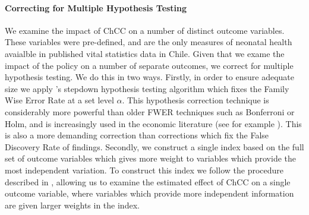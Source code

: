 \documentclass[12pt]{article}
\begin{document}
\begin{spacing}{1.4}

\paragraph{Correcting for Multiple Hypothesis Testing}
We examine the impact of ChCC on a number of distinct outcome
variables.  These variables were pre-defined, and are the only
measures of neonatal health avaialble in published vital statistics
data in Chile.  Given that we exame the impact of the policy on a
number of separate outcomes, we correct for multiple hypothesis
testing.  We do this in two ways.  Firstly, in order to ensure
adequate size we apply \citet{RomanoWolf2005}'s stepdown hypothesis
testing algorithm which fixes the Family Wise Error Rate at a set
level $\alpha$.  This hypothesis correction technique is considerably
more powerful than older FWER techniques such as Bonferroni or Holm,
and is increasingly used in the economic literature (see for example
\citet{Gertler2014}).  This is also a more demanding correction than
corrections which fix the False Discovery Rate of findings.
Secondly, we construct a single index based on the full set of
outcome variables which gives more weight to variables which
provide the most independent variation.  To construct this index
we follow the procedure described in \citet{Anderson2008}, allowing
us to examine the estimated effect of ChCC on a single outcome
variable, where variables which provide more independent
information are given larger weights in the index.


\end{spacing}
\end{document}
